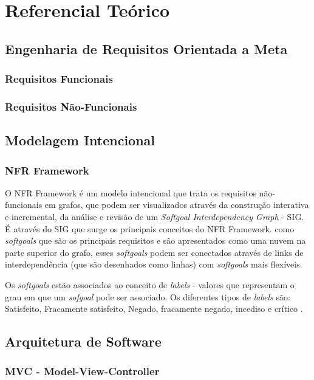 \chapter[Referencial Teórico]{Referencial Teórico}

\section{Engenharia de Requisitos Orientada a Meta}

\subsection{Requisitos Funcionais}

\subsection{Requisitos Não-Funcionais}

\section{Modelagem Intencional}

\subsection{NFR Framework}

O NFR Framework é um modelo intencional que trata os requisitos não-funcionais em grafos, que podem ser visualizados através da construção interativa e incremental, da análise e revisão de um \textit{Softgoal Interdependency Graph} - SIG. É através do SIG que surge os principais conceitos do NFR Framework. como \textit{softgoals} que são os principais requisitos e são apresentados como uma nuvem na parte superior do grafo, esses \textit{softgoals} podem ser conectados através de links de interdependência (que são desenhados como linhas) com \textit{softgoals} mais flexíveis\cite{chung2012non}.

Os \textit{softgoals} estão associados ao conceito de \textit{labels} - valores que representam o grau em que um \textit{sofgoal} pode ser associado. Os diferentes tipos de \textit{labels} são: Satisfeito, Fracamente satisfeito, Negado, fracamente negado, incediso e crítico \cite{chung2012non}. 

\section{Arquitetura de Software}

\subsection{MVC - Model-View-Controller}